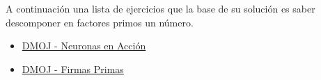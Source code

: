 A continuación una lista de ejercicios que la base de su solución es saber descomponer en factores primos un número.

\begin{itemize}
	\item \href{https://dmoj.uclv.edu.cu/problem/brain}{DMOJ - Neuronas en Acción}
	\item \href{https://dmoj.uclv.edu.cu/problem/firmaprime}{DMOJ - Firmas Primas}
\end{itemize}